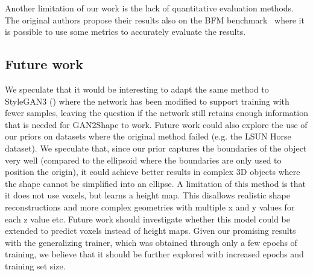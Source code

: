 Another limitation of our work is the lack of quantitative evaluation methods. The original authors propose their results also on the BFM benchmark~\cite{paysan20093d} where it is possible to use some metrics to accurately evaluate the results. 
\subsection{Future work}
We speculate that it would be interesting to adapt the same method to StyleGAN3 (\cite{stylegan3}) where the network has been modified to support training with fewer samples, leaving the question if the network still retains enough information that is needed for GAN2Shape to work. Future work could also explore the use of our priors on datasets where the original method failed (e.g. the LSUN Horse dataset). We speculate that, since our prior captures the boundaries of the object very well (compared to the ellipsoid where the boundaries are only used to position the origin), it could achieve better results in complex 3D objects where the shape cannot be simplified into an ellipse. A limitation of this method is that it does not use voxels, but learns a height map. This disallows realistic shape reconstructions and more complex geometries with multiple x and y values for each z value etc. Future work should investigate whether this model could be extended to predict voxels instead of height maps. Given our promising results with the generalizing trainer, which was obtained through only a few epochs of training, we believe that it should be further explored with increased epochs and training set size.
% 
% 
